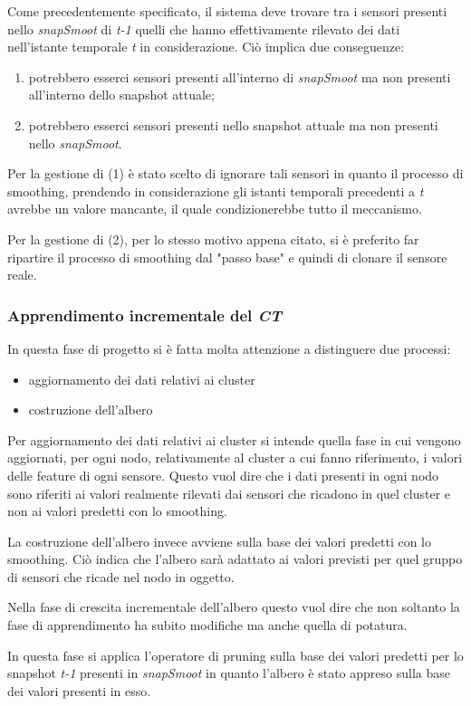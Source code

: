 \documentclass[12pt,a4paper,twoside,openright]{book}
\begin{document}
Come precedentemente specificato, il sistema deve trovare tra i sensori presenti nello \textit{snapSmoot} di \textit{t-1} quelli che hanno effettivamente rilevato dei dati nell'istante temporale \textit{t} in considerazione. Ciò implica due conseguenze: 
\begin{enumerate}
\item potrebbero esserci sensori presenti all'interno di \textit{snapSmoot} ma non presenti all'interno dello snapshot attuale;
\item potrebbero esserci sensori presenti nello snapshot attuale ma non presenti nello \textit{snapSmoot}.
\end{enumerate}
Per la gestione di (1) è stato scelto di ignorare tali sensori in quanto il processo di smoothing, prendendo in considerazione gli istanti temporali precedenti a \textit{t} avrebbe un valore mancante, il quale condizionerebbe tutto il meccanismo.

Per la gestione di (2), per lo stesso motivo appena citato, si è preferito far ripartire il processo di smoothing dal "passo base" e quindi di clonare il sensore reale.
\subsubsection{Apprendimento incrementale del \textit{CT}}
In questa fase di progetto si è fatta molta attenzione a distinguere due processi: 
\begin{itemize}
\item aggiornamento dei dati relativi ai cluster
\item costruzione dell'albero
\end{itemize}
Per aggiornamento dei dati relativi ai cluster si intende quella fase in cui vengono aggiornati, per ogni nodo, relativamente al cluster a cui fanno riferimento, i valori delle feature di ogni sensore. Questo vuol dire che i dati presenti in ogni nodo sono riferiti ai valori realmente rilevati dai sensori che ricadono in quel cluster e non ai valori predetti con lo smoothing.

La costruzione dell'albero invece avviene sulla base dei valori predetti con lo smoothing. Ciò indica che l'albero sarà adattato ai valori previsti per quel gruppo di sensori che ricade nel nodo in oggetto. 

Nella fase di crescita incrementale dell'albero questo vuol dire che non soltanto la fase di apprendimento ha subito modifiche ma anche quella di potatura. 

In questa fase si applica l'operatore di pruning sulla base dei valori predetti per lo snapshot \textit{t-1} presenti in \textit{snapSmoot} in quanto l'albero è stato appreso sulla base dei valori presenti in esso. 
\end{document}
